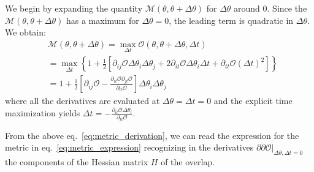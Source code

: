 \documentclass[twocolumn,showpacs,preprintnumbers,nofootinbib,prd,
superscriptaddress,10pt]{revtex4-2}
\begin{document}
We begin by expanding the quantity $\mathcal{M}(\theta,\theta +\Delta\theta)$ for $\Delta\theta$ around $0$. Since the $\mathcal{M}(\theta,\theta +\Delta\theta)$ has a maximum for $\Delta\theta = 0$, the leading term is quadratic in $\Delta\theta$.
We obtain:
\begin{align} \label{eq:metric_derivation}
	&\mathcal{M}(\theta,\theta +\Delta\theta) = \max_{\Delta t} \mathcal{O}(\theta, \theta + \Delta\theta, \Delta t) \nonumber\\
	& =	\max_{\Delta t} \left\{ 1+ \frac{1}{2}\left[ \partial_{ij}\mathcal{O} \Delta\theta_i \Delta\theta_j + 2  \partial_{it}\mathcal{O} \Delta\theta_i \Delta t + \partial_{tt}\mathcal{O} (\Delta t)^2 \right] \right\}  \nonumber \\
	&= 1 + \frac{1}{2}\left[ \partial_{ij}\mathcal{O} - \frac{\partial_{it}\mathcal{O} \partial_{jt}\mathcal{O}}{\partial_{tt}\mathcal{O}}\right] \Delta\theta_i \Delta\theta_j
\end{align}
where all the derivatives are evaluated at ${\Delta\theta = \Delta t = 0}$ and the explicit time maximization yields
${\Delta t = -\frac{\partial_{it}\mathcal{O} \Delta\theta_i}{\partial_{tt}\mathcal{O}}}$.

From the above eq.~\eqref{eq:metric_derivation}, we can read the expression for the metric in eq.~\eqref{eq:metric_expression} recognizing in the derivatives $\partial\partial\mathcal{O}|_{\Delta\theta, \Delta t = 0}$ the components of the Hessian matrix $H$ of the overlap.
\end{document}
